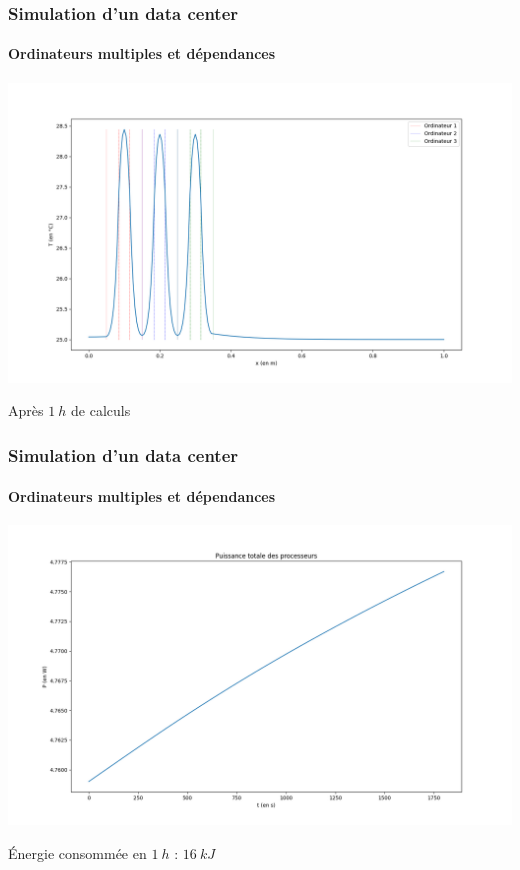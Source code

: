 \documentclass[a4paper,11pt]{beamer}
\begin{document}
\begin{frame}
    \frametitle{Simulation d'un data center}
    \framesubtitle{Ordinateurs multiples et dépendances}

    \includegraphics[width=\textwidth]{etat_final_3.png}

    \begin{center}
        Après $\SI{1}{h}$ de calculs
    \end{center}
\end{frame}

\begin{frame}
    \frametitle{Simulation d'un data center}
    \framesubtitle{Ordinateurs multiples et dépendances}

    \includegraphics[width=\textwidth]{puissance_3.png}

    \begin{center}
        Énergie consommée en $\SI{1}{h}$ : $\SI{16}{kJ}$
    \end{center}
\end{frame}
\end{document}
